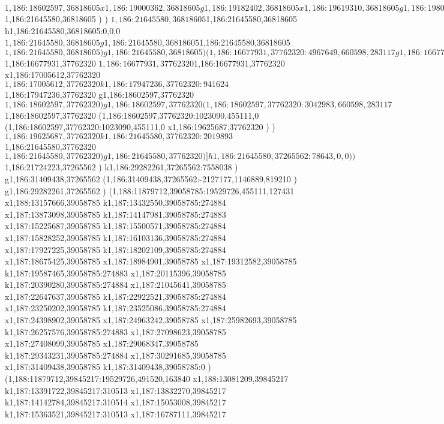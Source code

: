 {$1,186:18602597,36818605
x1,186:19000362,36818605
g1,186:19182402,36818605
x1,186:19619310,36818605
g1,186:19801350,36818605
x1,186:20298446,36818605
(1,186:20298446,36916908:455113,313481,0
x1,186:20607923,36916908
)
x1,186:21645580,36818605
$1,186:21645580,36818605
)
)
$1,186:21645580,36818605
$1,186:21645580,36818605
h1,186:21645580,36818605:0,0,0
$1,186:21645580,36818605
g1,186:21645580,36818605
$1,186:21645580,36818605
$1,186:21645580,36818605
)
g1,186:21645580,36818605
)
(1,186:16677931,37762320:4967649,660598,283117
g1,186:16677931,37762320
(1,186:16677931,37762320:1924666,660598,283117
r1,186:16677931,37762320:0,943715,283117
$1,186:16677931,37762320
$1,186:16677931,37762320
$1,186:16677931,37762320
x1,186:17005612,37762320
$1,186:17005612,37762320
k1,186:17947236,37762320:941624
$1,186:17947236,37762320
g1,186:18602597,37762320
$1,186:18602597,37762320
)
g1,186:18602597,37762320
(1,186:18602597,37762320:3042983,660598,283117
$1,186:18602597,37762320
(1,186:18602597,37762320:1023090,455111,0
(1,186:18602597,37762320:1023090,455111,0
x1,186:19625687,37762320
)
)
$1,186:19625687,37762320
k1,186:21645580,37762320:2019893
$1,186:21645580,37762320
$1,186:21645580,37762320
)
g1,186:21645580,37762320
)
]
h1,186:21645580,37265562:78643,0,0
)
)
$1,186:21724223,37265562
)
k1,186:29282261,37265562:7558038
)
g1,186:31409438,37265562
(1,186:31409438,37265562:-2127177,1146889,819210
)
g1,186:29282261,37265562
)
(1,188:11879712,39058785:19529726,455111,127431
x1,188:13157666,39058785
k1,187:13432550,39058785:274884
x1,187:13873098,39058785
k1,187:14147981,39058785:274883
x1,187:15225687,39058785
k1,187:15500571,39058785:274884
x1,187:15828252,39058785
k1,187:16103136,39058785:274884
x1,187:17927225,39058785
k1,187:18202109,39058785:274884
x1,187:18675425,39058785
x1,187:18984901,39058785
x1,187:19312582,39058785
k1,187:19587465,39058785:274883
x1,187:20115396,39058785
k1,187:20390280,39058785:274884
x1,187:21045641,39058785
x1,187:22647637,39058785
k1,187:22922521,39058785:274884
x1,187:23250202,39058785
k1,187:23525086,39058785:274884
x1,187:24398902,39058785
x1,187:24963242,39058785
x1,187:25982693,39058785
k1,187:26257576,39058785:274883
x1,187:27098623,39058785
x1,187:27408099,39058785
x1,187:29068347,39058785
k1,187:29343231,39058785:274884
x1,187:30291685,39058785
x1,187:31409438,39058785
k1,187:31409438,39058785:0
)
(1,188:11879712,39845217:19529726,491520,163840
x1,188:13081209,39845217
k1,187:13391722,39845217:310513
x1,187:13832270,39845217
k1,187:14142784,39845217:310514
x1,187:15053008,39845217
k1,187:15363521,39845217:310513
x1,187:16787111,39845217
}
